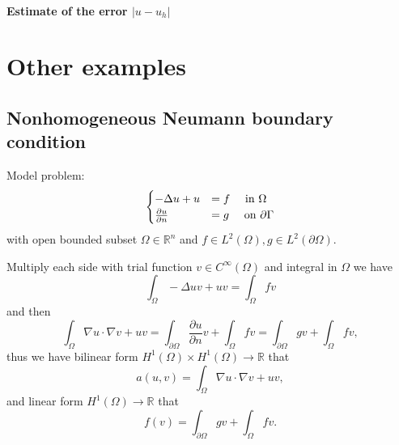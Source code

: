 \documentclass[11pt,letterpaper]{article}
\begin{document}
 
 \paragraph{Estimate of the error $\vert u-u_h\vert $}
 

 
\section{Other examples}
\label{sec:exam}


\subsection{Nonhomogeneous Neumann boundary condition}
\label{sec:neumann}
Model problem:
\begin{equation}
  \label{eq:neumann}
  \begin{cases}
    -\Delta u+u&= f\quad \textmd{ in }\Omega\\
    \frac{\partial u}{\partial n}&=g \quad \textmd{ on }\partial \Gamma
  \end{cases}
\end{equation}
with open bounded subset $\Omega\in \mathbb{R}^n$ and $f\in L^2(\Omega), g\in L^2(\partial\Omega)$.

Multiply each side with trial function $v\in C^\infty(\Omega)$ and integral in $\Omega$ we have
\begin{displaymath}
  \int_{\Omega}-\Delta u v+uv=\int_\Omega fv
\end{displaymath}
and then
\begin{displaymath}
  \int_{\Omega} \nabla u\cdot \nabla v +uv= \int_{\partial \Omega}\frac{\partial u}{\partial n}v +\int_\Omega fv
  =\int_{\partial \Omega}gv +\int_\Omega fv,
\end{displaymath}
thus we have bilinear form $H^1(\Omega)\times H^1(\Omega)\rightarrow \mathbb{R}$ that
\begin{displaymath}
  a(u,v)= \int_{\Omega} \nabla u\cdot \nabla v+uv,
\end{displaymath}
and linear form $H^1(\Omega)\rightarrow \mathbb{R}$ that 
\begin{displaymath}
  f(v)=\int_{\partial \Omega}gv +\int_\Omega fv.
\end{displaymath}
\end{document}
